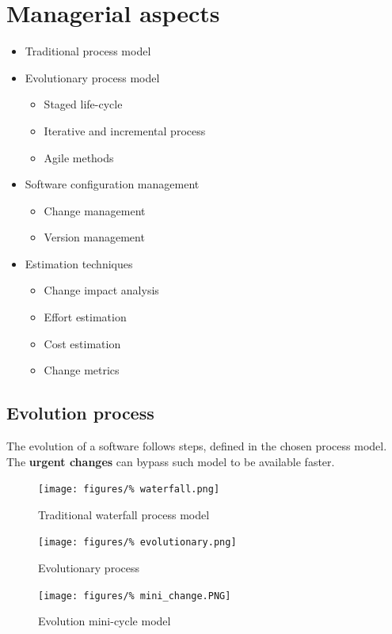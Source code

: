 \documentclass[a4paper,11pt]{report}
\begin{document}
\section{Managerial aspects}
	\begin{itemize}
		\item Traditional process model
		\item Evolutionary process model
			\begin{itemize}	
				\setlength{\itemsep}{0pt}		
				\setlength{\parskip}{0pt}		
				\setlength{\parsep}{0pt}	
				\item Staged life-cycle
				\item Iterative and incremental 
					process
				\item Agile methods
			\end{itemize}
		\item Software configuration management
			\begin{itemize}
				\setlength{\itemsep}{0pt}		
				\setlength{\parskip}{0pt}		
				\setlength{\parsep}{0pt}	
				\item Change management
				\item Version management
			\end{itemize}
		\item Estimation techniques
			\begin{itemize}	
				\setlength{\itemsep}{0pt}		
				\setlength{\parskip}{0pt}		
				\setlength{\parsep}{0pt}	
				\item Change impact analysis
				\item Effort estimation
				\item Cost estimation
				\item Change metrics
			\end{itemize}
	\end{itemize}
	\subsection{Evolution process}
		The evolution of a software follows steps,
			defined in the chosen process model.
			The \textbf{urgent changes} can bypass 
			such model to be available faster.
		\begin{figure}[H]
			\centering
			\texttt{[image: figures/\%
				waterfall.png]}
			\caption{Traditional waterfall process model}
		\end{figure}\noindent
		\begin{figure}[H]
			\centering
			\texttt{[image: figures/\%
				evolutionary.png]}
			\caption{Evolutionary process}
		\end{figure}\noindent
		\begin{figure}[H]
			\centering
			\texttt{[image: figures/\%
				mini\_change.PNG]}
			\caption{Evolution mini-cycle model}
		\end{figure}\noindent
\end{document}
